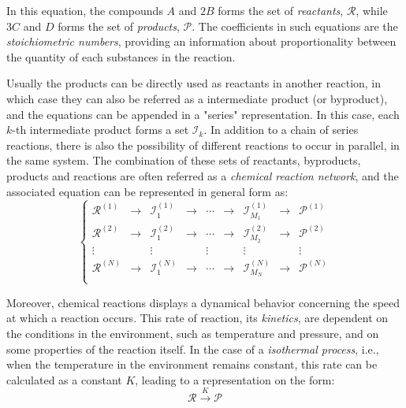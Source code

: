 \documentclass[a4paper,11pt]{book}
\numberwithin{figure}{chapter}
\numberwithin{equation}{chapter}
\numberwithin{table}{chapter}
\theoremstyle{definition}
\begin{document}
In this equation, the compounds $A$ and $2 B$ forms the set of \textit{reactants}, $\mathcal{R}$, while $3 C$ and $D$ forms the set of \textit{products}, $\mathcal{P}$. The coefficients in such equations are the \textit{stoichiometric numbers}, providing an information about proportionality between the quantity of each substances in the reaction. 

Usually the products can be directly used as reactants in another reaction, in which case they can also be referred as a intermediate product (or byproduct), and the equations can be appended in a "series" representation. In this case, each $k$-th intermediate product forms a set $\mathcal{I}_k$. In addition to a chain of series reactions, there is also the possibility of different reactions to occur in parallel, in the same system. The combination of these sets of reactants, byproducts, products and reactions are often referred as a \textit{chemical reaction network}, and the associated equation can be represented in general form as:
\begin{equation} \label{eq:chemNetwork}
\left\{ \begin{matrix}
    \mathcal{R}^{(1)}  & \longrightarrow & \mathcal{I}^{(1)}_1  &  \longrightarrow & \cdots & \longrightarrow & \mathcal{I}^{(1)}_{M_1} & \longrightarrow & \mathcal{P}^{(1)} \\
    \mathcal{R}^{(2)} & \longrightarrow & \mathcal{I}^{(2)}_1  &  \longrightarrow & \cdots & \longrightarrow & \mathcal{I}^{(2)}_{M_2} & \longrightarrow & \mathcal{P}^{(2)} \\
    \vdots &  & \vdots &  & \vdots &  & \vdots &  & \vdots \\
    \mathcal{R}^{(N)} & \longrightarrow & \mathcal{I}^{(N)}_1  &  \longrightarrow & \cdots & \longrightarrow & \mathcal{I}^{(N)}_{M_N} & \longrightarrow & \mathcal{P}^{(N)} \\
\end{matrix} \right.
\end{equation} 

Moreover, chemical reactions displays a dynamical behavior concerning the speed at which a reaction occurs. This rate of reaction, its \textit{kinetics}, are dependent on the conditions in the environment, such as temperature and pressure, and on some properties of the reaction itself. In the case of a \textit{isothermal process}, i.e., when the temperature in the environment remains constant, this rate can be calculated as a constant $K$, leading to a representation on the form:
\begin{equation}
    \mathcal{R} \overset{K}{\longrightarrow} \mathcal{P}
\end{equation} 
\end{document}
